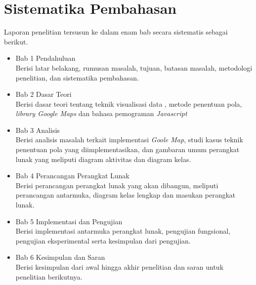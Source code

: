 \section{Sistematika Pembahasan}
\label{sec:sispem}
Laporan penelitian tersusun ke dalam enam bab secara sistematis sebagai berikut.
\begin{itemize}
    \item Bab 1 Pendahuluan\\
    Berisi latar belakang, rumusan masalah, tujuan, batasan masalah, metodologi penelitian, dan sistematika pembahasan.
   
   \item Bab 2 Dasar Teori\\
    Berisi dasar teori tentang teknik visualisasi data , metode penentuan pola, \textit{library Google Maps} dan bahasa pemograman \textit{Javascript}
   
    \item Bab 3 Analisis\\
    Berisi analisis masalah terkait implementasi \textit{Goole Map}, studi kasus teknik penentuan pola yang diimplementasikan, dan gambaran umum perangkat lunak yang meliputi diagram aktivitas dan diagram kelas.
  
    \item Bab 4 Perancangan Perangkat Lunak\\
    Berisi perancangan perangkat lunak yang akan dibangun, meliputi perancangan antarmuka,
diagram kelas lengkap dan masukan perangkat lunak.
    
    \item Bab 5 Implementasi dan Pengujian\\
Berisi implementasi antarmuka perangkat lunak, pengujian fungsional, pengujian eksperimental
serta kesimpulan dari pengujian.
   
    \item Bab 6 Kesimpulan dan Saran\\
    Berisi kesimpulan dari awal hingga akhir penelitian dan saran untuk penelitian berikutnya.
\end{itemize}